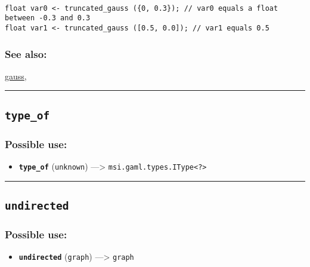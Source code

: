 \documentclass[]{book}
\providecommand{\tightlist}{%
  \setlength{\itemsep}{0pt}\setlength{\parskip}{0pt}}
\theoremstyle{definition}
\theoremstyle{definition}
\theoremstyle{definition}
\theoremstyle{remark}
\begin{document}
\begin{verbatim}
 
float var0 <- truncated_gauss ({0, 0.3}); // var0 equals a float between -0.3 and 0.3 
float var1 <- truncated_gauss ([0.5, 0.0]); // var1 equals 0.5
\end{verbatim}

\subsubsection{See also:}\label{see-also-212}

\href{operators-d-to-h.html\#gauss}{gauss},

\begin{center}\rule{0.5\linewidth}{\linethickness}\end{center}

\subsection{\texorpdfstring{\texttt{type\_of}}{type\_of}}\label{type_of}

\subsubsection{Possible use:}\label{possible-use-536}

\begin{itemize}
\tightlist
\item
  \textbf{\texttt{type\_of}} (\texttt{unknown}) ---\textgreater{}
  \texttt{msi.gaml.types.IType\textless{}?\textgreater{}}
\end{itemize}

\begin{center}\rule{0.5\linewidth}{\linethickness}\end{center}

\subsection{\texorpdfstring{\texttt{undirected}}{undirected}}\label{undirected}

\subsubsection{Possible use:}\label{possible-use-537}

\begin{itemize}
\tightlist
\item
  \textbf{\texttt{undirected}} (\texttt{graph}) ---\textgreater{}
  \texttt{graph}
\end{itemize}
\end{document}
